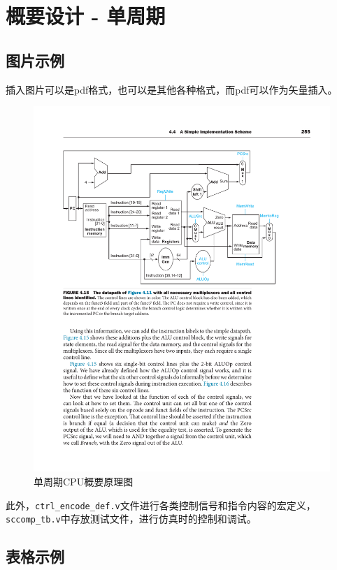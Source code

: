 \documentclass[UTF8,a4paper,autofakebold,15pt]{ctexart}
\begin{document}
\newpage

\section{概要设计 - 单周期}

\subsection{图片示例}

插入图片可以是pdf格式，也可以是其他各种格式，而pdf可以作为矢量插入。

\begin{figure}[ht]
	\centering
	\includegraphics{fig1.pdf}
	\caption{单周期CPU概要原理图\cite{ref1}}
	\label{fig:label1}
\end{figure}

此外，{\tt ctrl\_encode\_def.v}文件进行各类控制信号和指令内容的宏定义，{\tt sccomp\_tb.v}中存放测试文件，进行仿真时的控制和调试。

\subsection{表格示例}
\end{document}
